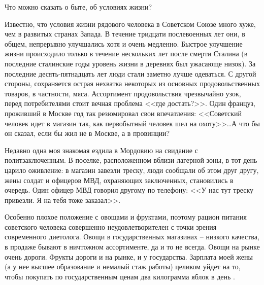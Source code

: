 \documentclass{book}
\begin{document}
Что можно сказать о быте, об условиях жизни?

Известно, что условия жизни рядового человека в Советском Союзе много хуже, чем в развитых странах Запада. В течение тридцати 
послевоенных лет они, в общем, непрерывно улучшались хотя и очень медленно. Быстрое улучшение жизни происходило только в течение 
нескольких лет после смерти Сталина (в последние сталинские годы уровень жизни в дерев­нях был ужасающе низок). За последние 
десять-пятнадцать лет люди стали заметно лучше одеваться. С другой стороны, сохраняется острая нехватка некоторых из основных 
продовольственных товаров, в частности, мяса. Ассортимент продовольствия чрезвычайно узок, перед потребителями стоит вечная 
проблема <<где достать?>>. Один француз, проживший в Москве год так резюмировал свои впечатления: <<Советский человек идет в 
магазин так, как первобытный человек шел на охоту>>\ldots А что бы он сказал, если бы жил не в Москве, а в провинции?

Недавно одна моя знакомая ездила в Мордовию на свидание с политзаключенным. В поселке, расположенном вблизи лагерной зоны, в тот 
день царило оживление: в магазин завезли треску, люди сообщали об этом друг другу, жены солдат и офицеров МВД, охраняющих 
заключенных, становились в очередь. Один офицер МВД говорил другому по телефону: <<У нас тут треску привезли. Я на тебя тоже 
заказал>>.

Особенно плохое положение с овощами и фруктами, поэтому рацион питания советского человека совершенно неудовлетворителен с точки 
зрения современного диетолога. Овощи в государственных магазинах -- низкого качества, в продаже бывают в ничтожном ассортименте, 
да и то не всегда. Овощи на рынке очень дороги. Фрукты дороги и на рынке, и у государства. Зарплата моей жены (а у нее высшее 
образование и немалый стаж работы) целиком уйдет на то, чтобы покупать по государственным ценам два килограмма яблок в день%
.
\end{document}
